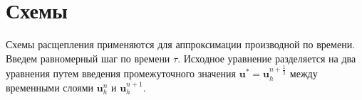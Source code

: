 \documentclass[12pt]{article}
\begin{document}
\section{Схемы}
Схемы расщепления применяются для аппроксимации производной по времени. Введем равномерный шаг по времени $\tau$. Исходное уравнение разделяется на два уравнения путем введения промежуточного значения ${\bm u}^*={\bm u}_h^{n+\frac{1}{2}}$ между временными слоями ${\bm u}_h^n$ и ${\bm u}_h^{n+1}$.
\end{document}
